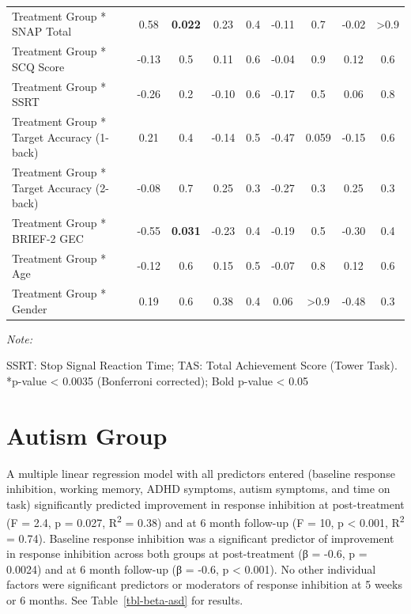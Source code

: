 \documentclass[
  letterpaper,
]{ut-thesis}
\begin{document}
\begin{landscape}
\begin{table}
{\begin{threeparttable}
{\begin{tabular}{lcccccccc}
Treatment Group * SNAP Total & 0.58 & \textbf{0.022} & 0.23 & 0.4 & -0.11 & 0.7 & -0.02 & >0.9\\
Treatment Group * SCQ Score & -0.13 & 0.5 & 0.11 & 0.6 & -0.04 & 0.9 & 0.12 & 0.6\\
Treatment Group * SSRT & -0.26 & 0.2 & -0.10 & 0.6 & -0.17 & 0.5 & 0.06 & 0.8\\
Treatment Group * Target Accuracy (1-back) & 0.21 & 0.4 & -0.14 & 0.5 & -0.47 & 0.059 & -0.15 & 0.6\\
Treatment Group * Target Accuracy (2-back) & -0.08 & 0.7 & 0.25 & 0.3 & -0.27 & 0.3 & 0.25 & 0.3\\
Treatment Group * BRIEF-2 GEC & -0.55 & \textbf{0.031} & -0.23 & 0.4 & -0.19 & 0.5 & -0.30 & 0.4\\
Treatment Group * Age & -0.12 & 0.6 & 0.15 & 0.5 & -0.07 & 0.8 & 0.12 & 0.6\\
Treatment Group * Gender & 0.19 & 0.6 & 0.38 & 0.4 & 0.06 & >0.9 & -0.48 & 0.3\\
\bottomrule
\end{tabular}}
\begin{tablenotes}[para]
\item \textit{Note: } 
\item SSRT: Stop Signal Reaction Time; TAS: Total Achievement Score (Tower Task). *p-value < 0.0035 (Bonferroni corrected); Bold p-value < 0.05
\end{tablenotes}
\end{threeparttable}

}

\end{table}%

\end{landscape}

\section{Autism Group}\label{autism-group}

A multiple linear regression model with all predictors entered (baseline
response inhibition, working memory, ADHD symptoms, autism symptoms, and
time on task) significantly predicted improvement in response inhibition
at post-treatment (F = 2.4, p = 0.027, R\textsuperscript{2} = 0.38) and
at 6 month follow-up (F = 10, p \textless{} 0.001, R\textsuperscript{2}
= 0.74). Baseline response inhibition was a significant predictor of
improvement in response inhibition across both groups at post-treatment
(β = -0.6, p = 0.0024) and at 6 month follow-up (β = -0.6, p \textless{}
0.001). No other individual factors were significant predictors or
moderators of response inhibition at 5 weeks or 6 months. See
Table~\ref{tbl-beta-asd} for results.
\end{document}
